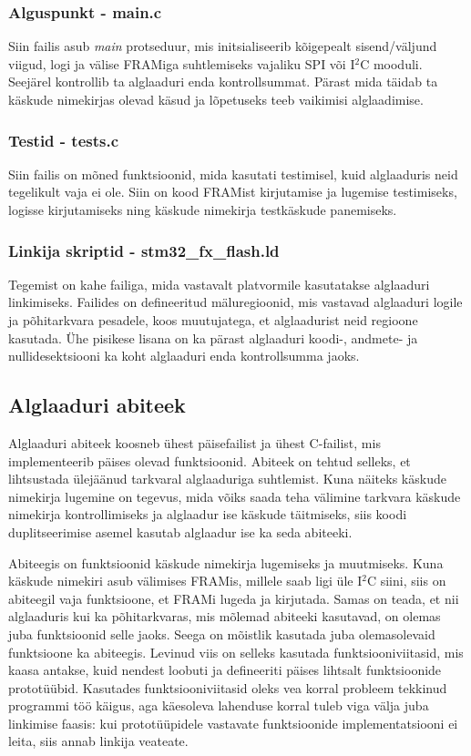 \documentclass[12pt,a4paper]{article}
\newcommand{\iic}{I${}^2$C }
\begin{document}
\subsubsection{Alguspunkt - \textbf{main.c}}
Siin failis asub \textit{main} protseduur, mis initsialiseerib kõigepealt
sisend/väljund viigud, logi ja välise FRAMiga suhtlemiseks vajaliku SPI või \iic
mooduli. Seejärel kontrollib ta alglaaduri enda kontrollsummat. Pärast mida
täidab ta käskude nimekirjas olevad käsud ja lõpetuseks teeb vaikimisi
alglaadimise.

\subsubsection{Testid - \textbf{tests.c}}
Siin failis on mõned funktsioonid, mida kasutati testimisel, kuid alglaaduris
neid tegelikult vaja ei ole. Siin on kood FRAMist kirjutamise ja lugemise
testimiseks, logisse kirjutamiseks ning käskude nimekirja testkäskude
panemiseks.

\subsubsection{Linkija skriptid - \textbf{stm32\_fx\_flash.ld}}
Tegemist on kahe failiga, mida vastavalt platvormile kasutatakse alglaaduri
linkimiseks. Failides on defineeritud mäluregioonid, mis vastavad alglaaduri
logile ja põhitarkvara pesadele, koos muutujatega, et alglaadurist neid regioone
kasutada. Ühe pisikese lisana on ka pärast alglaaduri koodi-, andmete- ja
nullidesektsiooni ka koht alglaaduri enda kontrollsumma jaoks.

\subsection{Alglaaduri abiteek}
Alglaaduri abiteek koosneb ühest päisefailist ja ühest C-failist, mis
implementeerib päises olevad funktsioonid. Abiteek on tehtud selleks, et
lihtsustada ülejäänud tarkvaral alglaaduriga suhtlemist. Kuna näiteks käskude
nimekirja lugemine on tegevus, mida võiks saada teha välimine tarkvara käskude
nimekirja kontrollimiseks ja alglaadur ise käskude täitmiseks, siis koodi
duplitseerimise asemel kasutab alglaadur ise ka seda abiteeki.

Abiteegis on funktsioonid käskude nimekirja lugemiseks ja muutmiseks. Kuna
käskude nimekiri asub välimises FRAMis, millele saab ligi üle \iic siini, siis
on abiteegil vaja funktsioone, et FRAMi lugeda ja kirjutada. Samas on teada, et
nii alglaaduris kui ka põhitarkvaras, mis mõlemad abiteeki kasutavad, on olemas
juba funktsioonid selle jaoks. Seega on mõistlik kasutada juba olemasolevaid
funktsioone ka abiteegis. Levinud viis on selleks kasutada funktsiooniviitasid,
mis kaasa antakse, kuid nendest loobuti ja defineeriti päises lihtsalt
funktsioonide prototüübid. Kasutades funktsiooniviitasid oleks vea korral
probleem tekkinud programmi töö käigus, aga käesoleva lahenduse korral tuleb
viga välja juba linkimise faasis: kui prototüüpidele vastavate funktsioonide
implementatsiooni ei leita, siis annab linkija veateate.
\end{document}
